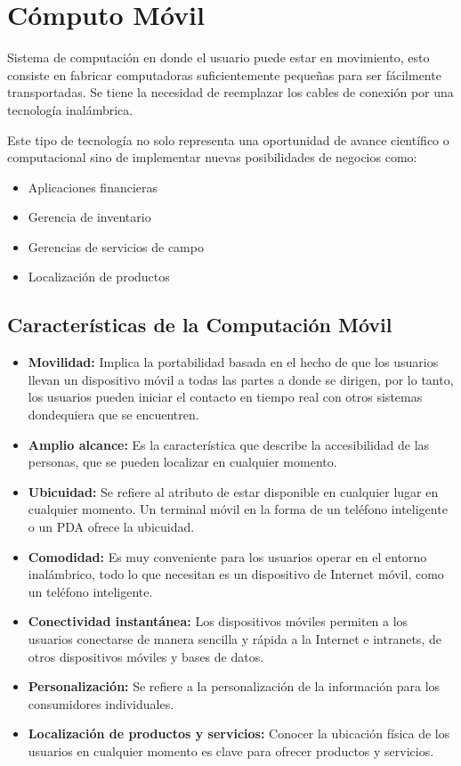 \section{Cómputo Móvil}

Sistema de computación en donde el usuario puede estar en movimiento, esto consiste en fabricar computadoras suficientemente pequeñas para ser fácilmente transportadas. Se tiene la necesidad de reemplazar los cables de conexión por una tecnología inalámbrica.

Este tipo de tecnología no solo representa una oportunidad de avance científico o computacional sino de implementar nuevas posibilidades de negocios como:

\begin{itemize}
	\item Aplicaciones financieras
	\item Gerencia de inventario
	\item Gerencias de servicios de campo
	\item Localización de productos
\end{itemize}

\subsection{Características de la Computación Móvil}

\begin{itemize}
	\item \textbf{Movilidad: }Implica la portabilidad basada en el hecho de que los usuarios llevan un dispositivo móvil a todas las partes a donde se dirigen, por lo tanto, los usuarios pueden iniciar el contacto en tiempo real con otros sistemas dondequiera que se encuentren.
	\item \textbf{Amplio alcance: }Es la característica que describe la accesibilidad de las personas, que se pueden localizar en cualquier momento.
	\item \textbf{Ubicuidad: }Se refiere al atributo de estar disponible en cualquier lugar en cualquier momento. Un terminal móvil en la forma de un teléfono inteligente o un PDA ofrece la ubicuidad.
	\item \textbf{Comodidad: }Es muy conveniente para los usuarios operar en el entorno inalámbrico, todo lo que necesitan es un dispositivo de Internet móvil, como un teléfono inteligente.
	\item \textbf{Conectividad instantánea: }Los dispositivos móviles permiten a los usuarios conectarse de manera sencilla y rápida a la Internet e intranets, de otros dispositivos móviles y bases de datos.
	\item \textbf{Personalización: }Se refiere a la personalización de la información para los consumidores individuales.
    	\item \textbf{Localización de productos y servicios: }Conocer la ubicación física de los usuarios en cualquier momento es clave para ofrecer productos y servicios.
\end{itemize}